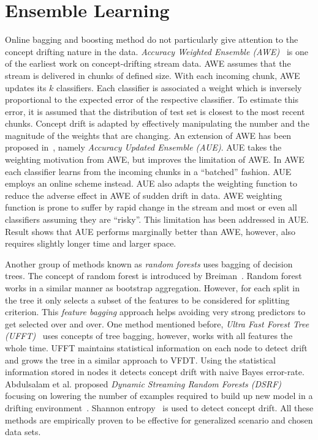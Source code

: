 \section*{Ensemble Learning}

Online bagging and boosting method do not particularly give attention to the concept drifting nature in the data. \textit{Accuracy Weighted Ensemble (AWE)}~\cite{wang03:accuweighted} is one of the earliest work on concept-drifting stream data. AWE assumes that the stream is delivered in chunks of defined size. With each incoming chunk, AWE updates its $k$ classifiers. Each classifier is associated a weight which is inversely proportional to the expected error of the respective classifier. To estimate this error, it is assumed that the distribution of test set is closest to the most recent chunks. Concept drift is adapted by effectively manipulating the number and the magnitude of the weights that are changing. An extension of AWE has been proposed in~\cite{brzezinski11:accuupdated}, namely \textit{Accuracy Updated Ensemble (AUE)}. AUE takes the weighting motivation from AWE, but improves the limitation of AWE. In AWE each classifier learns from the incoming chunks in a ``batched'' fashion. AUE employs an online scheme instead. AUE also adapts the weighting function to reduce the adverse effect in AWE of sudden drift in data. AWE weighting function is prone to suffer by rapid change in the stream and most or even all classifiers assuming they are ``risky''. This limitation has been addressed in AUE. Result shows that AUE performs marginally better than AWE, however, also requires slightly longer time and larger space.


Another group of methods known as \textit{random forests} uses bagging of decision trees. The concept of random forest is introduced by Breiman~\cite{breiman99:randomforest}. Random forest works in a similar manner as bootstrap aggregation. However, for each split in the tree it only selects a subset of the features to be considered for splitting criterion. This \textit{feature bagging} approach helps avoiding very strong predictors to get selected over and over. One method mentioned before, \textit{Ultra Fast Forest Tree (UFFT)}~\cite{gama04:ft, gama05:ft} uses concepts of tree bagging, however, works with all features the whole time. UFFT maintains statistical information on each node to detect drift and grows the tree in a similar  approach to VFDT. Using the statistical information stored in nodes it detects concept drift with naive Bayes error-rate. Abdulsalam et al. proposed \textit{Dynamic Streaming Random Forests (DSRF)} focusing on lowering the number of examples required to build up new model in a drifting environment~\cite{salam08:dsrf, salam11:dsrf}. Shannon entropy~\cite{shannon01:entropy} is used to detect concept drift. All these methods are empirically proven to be effective for generalized scenario and chosen data sets. 


